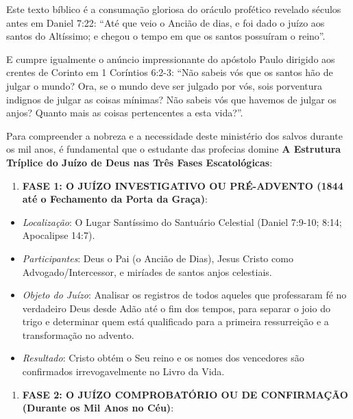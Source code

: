 Este texto bíblico é a consumação gloriosa do oráculo profético revelado séculos antes em Daniel 7:22:
``Até que veio o Ancião de dias, e foi dado o juízo aos santos do Altíssimo; e chegou o tempo em que os santos possuíram o reino''.

E cumpre igualmente o anúncio impressionante do apóstolo Paulo dirigido aos crentes de Corinto em 1 Coríntios 6:2-3:
``Não sabeis vós que os santos hão de julgar o mundo? Ora, se o mundo deve ser julgado por vós, sois porventura indignos de julgar as coisas mínimas? Não sabeis vós que havemos de julgar os anjos? Quanto mais as coisas pertencentes a esta vida?''.

Para compreender a nobreza e a necessidade deste ministério dos salvos durante os mil anos, é fundamental que o estudante das profecias domine \textbf{A Estrutura Tríplice do Juízo de Deus nas Três Fases Escatológicas}:

\begin{enumerate}
  \item \textbf{FASE 1: O JUÍZO INVESTIGATIVO OU PRÉ-ADVENTO (1844 até o Fechamento da Porta da Graça)}:
\end{enumerate}

\begin{itemize}
  \item \textit{Localização}: O Lugar Santíssimo do Santuário Celestial (Daniel 7:9-10; 8:14; Apocalipse 14:7).
  \item \textit{Participantes}: Deus o Pai (o Ancião de Dias), Jesus Cristo como Advogado/Intercessor, e miríades de santos anjos celestiais.
  \item \textit{Objeto do Juízo}: Analisar os registros de todos aqueles que professaram fé no verdadeiro Deus desde Adão até o fim dos tempos, para separar o joio do trigo e determinar quem está qualificado para a primeira ressurreição e a transformação no advento.
  \item \textit{Resultado}: Cristo obtém o Seu reino e os nomes dos vencedores são confirmados irrevogavelmente no Livro da Vida.
\end{itemize}


\begin{enumerate}
  \item \textbf{FASE 2: O JUÍZO COMPROBATÓRIO OU DE CONFIRMAÇÃO (Durante os Mil Anos no Céu)}:
\end{enumerate}

